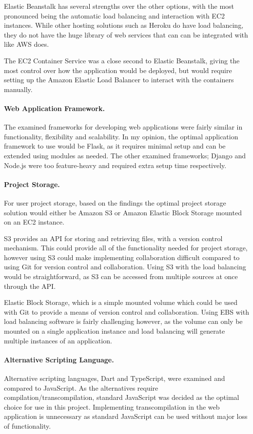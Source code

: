Elastic Beanstalk has several strengths over the other options, with the most pronounced being the automatic load balancing and interaction with EC2 instances. While other hosting solutions such as Heroku do have load balancing, they do not have the huge library of web services that can can be integrated with like AWS does.

The EC2 Container Service was a close second to Elastic Beanstalk, giving the most control over how the application would be deployed, but would require setting up the Amazon Elastic Load Balancer to interact with the containers manually.

\paragraph{Web Application Framework.}
The examined frameworks for developing web applications were fairly similar in functionality, flexibility and scalability. In my opinion, the optimal application framework to use would be Flask, as it requires minimal setup and can be extended using modules as needed. The other examined frameworks; Django and Node.js were too feature-heavy and required extra setup time respectively.

\paragraph{Project Storage.}
For user project storage, based on the findings the optimal project storage solution would either be Amazon S3 or Amazon Elastic Block Storage mounted on an EC2 instance.

S3 provides an API for storing and retrieving files, with a version control mechanism. This could provide all of the functionality needed for project storage, however using S3 could make implementing collaboration difficult compared to using Git for version control and collaboration. Using S3 with the load balancing would be straightforward, as S3 can be accessed from multiple sources at once through the API.

Elastic Block Storage, which is a simple mounted volume which could be used with Git to provide a means of version control and collaboration. Using EBS with load balancing software is fairly challenging however, as the volume can only be mounted on a single application instance and load balancing will generate multiple instances of an application.

\paragraph{Alternative Scripting Language.}
Alternative scripting languages, Dart and TypeScript, were examined and compared to JavaScript. As the alternatives require compilation/transcompilation, standard JavaScript was decided as the optimal choice for use in this project. Implementing transcompilation in the web application is unnecessary as standard JavaScript can be used without major loss of functionality.

